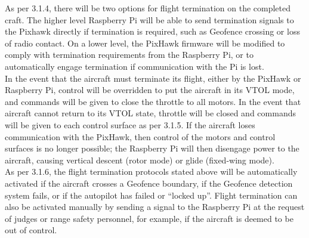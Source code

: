 As per 3.1.4, there will be two options for flight termination on the completed craft. The higher level Raspberry Pi will be able to send termination signals to the Pixhawk directly if termination is required, such as Geofence crossing or loss of radio contact.  On a lower level, the PixHawk firmware will be modified to comply with termination requirements from the Raspberry Pi, or to automatically engage termination if communication with the Pi is lost.\\

In the event that the aircraft must terminate its flight, either by the PixHawk or Raspberry Pi, control will be overridden to put the aircraft in its VTOL mode, and commands will be given to close the throttle to all motors. In the event that aircraft cannot return to its VTOL state, throttle will be closed and commands will be given to each control surface as per 3.1.5. If the aircraft loses communication with the PixHawk, then control of the motors and control surfaces is no longer possible; the Raspberry Pi will then disengage power to the aircraft, causing vertical descent (rotor mode) or glide (fixed-wing mode). \\

As per 3.1.6, the flight termination protocols stated above will be automatically activated if the aircraft crosses a Geofence boundary, if the Geofence detection system fails, or if the autopilot has failed or ``locked up''. Flight termination can also be activated manually by sending a signal to the Raspberry Pi at the request of judges or range safety personnel, for example, if the aircraft is deemed to be out of control.
